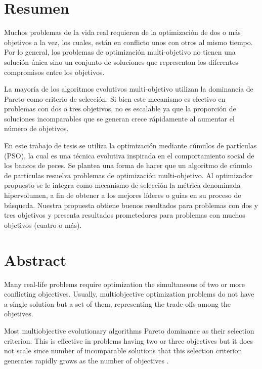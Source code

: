 \chapter*{Resumen}

  Muchos problemas de la vida real requieren de la optimizaci\'on de dos o m\'as objetivos a la vez, los cuales, 
  est\'an en conflicto unos con otros al mismo tiempo. Por lo general, los problemas de optimizaci\'on multi-objetivo
  no tienen una soluci\'on \'unica sino un conjunto de soluciones que representan los diferentes compromisos entre 
  los objetivos. 

  La mayor\'ia de los algoritmos evolutivos multi-objetivo utilizan la dominancia de Pareto como criterio de
  selecci\'on. Si bien este mecanismo es efectivo en problemas con dos o tres objetivos, no es escalable ya 
  que la proporci\'on de soluciones incomparables que se generan crece r\'apidamente al aumentar el n\'umero de objetivos.

  En este trabajo de tesis se utiliza la optimizaci\'on mediante c\'umulos de part\'iculas 
  (PSO), la cual es una t\'ecnica evolutiva inspirada en el comportamiento social de los bancos de peces. Se plantea 
  una forma de hacer que un algoritmo de c\'umulo de part\'iculas resuelva problemas de optimizaci\'on multi-objetivo.
  Al optimizador propuesto se le integra como mecanismo de selecci\'on la m\'etrica denominada hipervolumen, 
  a fin de obtener a los mejores l\'ideres o gu\'ias en su proceso de b\'usqueda. Nuestra propuesta obtiene buenos resultados 
  para problemas con dos y tres objetivos y presenta resultados prometedores para problemas con muchos objetivos (cuatro o 
  m\'as).


\chapter*{Abstract}

  Many real-life problems require optimization the simultaneous of two or more conflicting objectives. 
  Usually, multiobjective optimization problems do not have a single solution but a set of them,
  representing the trade-offs among the objetives.

  Most multiobjective evolutionary algorithms \DIFdelbegin {}\DIFdelend \DIFaddbegin {}\DIFaddend Pareto dominance as their selection criterion. This 
  \DIFdelbegin {}\DIFdelend \DIFaddbegin {}\DIFaddend is effective in problems having two or three objectives but it does not \DIFdelbegin {}\DIFdelend \DIFaddbegin {}\DIFaddend scale since 
  number of incomparable solutions that this selection criterion generates rapidly grows as \DIFdelbegin {}\DIFdelend the
  number of objectives \DIFaddbegin {}\DIFaddend .


